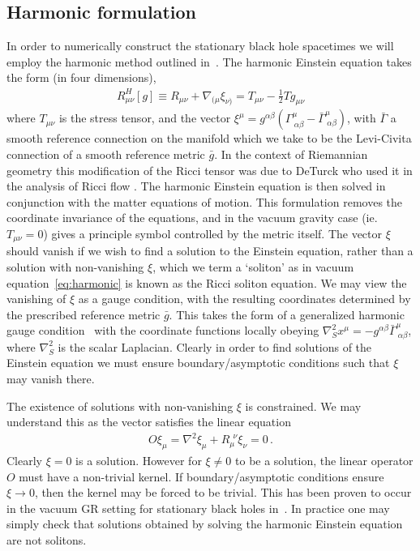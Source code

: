 \documentclass[12pt]{article}
\numberwithin{equation}{section}
\begin{document}
\subsection{Harmonic formulation}

In order to numerically construct the stationary black hole spacetimes we will employ the harmonic method outlined in~\cite{Headrick:2009pv,Adam:2011dn,Figueras:2012rb}.
The harmonic Einstein equation 
takes the form (in four dimensions),
\begin{eqnarray}
\label{eq:harmonic}
R^H_{\mu\nu}[g] \equiv R_{\mu\nu} + \nabla_{(\mu} \xi_{\nu)} = T_{\mu\nu} - \frac{1}{2} T g_{\mu\nu}
\end{eqnarray}
where $T_{\mu\nu}$ is the stress tensor, and the vector $\xi^\mu = g^{\alpha\beta} \left( \Gamma^\mu_{~\alpha\beta} - \bar{\Gamma}^\mu_{~\alpha\beta} \right)$, with $\bar{\Gamma}$ a smooth reference connection on the manifold which we take to be the Levi-Civita connection of a smooth reference metric $\bar{g}$. 
In the context of Riemannian geometry this modification of the Ricci tensor was due to DeTurck who used it in the analysis of Ricci flow \cite{DeTurck}.
The harmonic Einstein equation is then solved in conjunction with the matter equations of motion.
This formulation removes the coordinate invariance of the equations, and in the vacuum gravity case (ie. $T_{\mu\nu} = 0$) gives a principle symbol controlled by the metric itself. 
%
The vector $\xi$ should vanish if we wish to find a solution to the Einstein equation, rather than a solution with non-vanishing $\xi$, which we term a `soliton' as in vacuum  equation~\eqref{eq:harmonic}  is known as the Ricci soliton equation.
We may view the vanishing of $\xi$ as a gauge condition, with the resulting coordinates determined by the prescribed reference metric $\bar{g}$.
This takes the form of a generalized harmonic gauge condition~\cite{Friedrich,Garfinkle:2001ni} with the coordinate functions locally obeying $\nabla_S^2 x^\mu = - g^{\alpha\beta} \bar{\Gamma}^\mu_{~\alpha\beta}$, where $\nabla^2_S$ is the scalar Laplacian.
Clearly in order to find solutions of the Einstein equation we must ensure boundary/asymptotic conditions such that $\xi$ may vanish there.

The existence of solutions with non-vanishing $\xi$ is constrained. We may understand this as the vector satisfies the linear equation
\begin{eqnarray}
\label{eq:Oop}
O \xi_\mu =  \nabla^2 \xi_{\mu} + R_{\mu}^{~~\nu} \xi_{\nu}= 0 \, .
\end{eqnarray}
Clearly $\xi = 0$ is a solution. However for $\xi \ne 0$ to be a solution, the linear operator $O$ must have a non-trivial kernel. If  boundary/asymptotic conditions ensure $\xi \to 0$, then the kernel may be forced to be trivial. This has been proven to occur in the vacuum GR setting for stationary black holes in~\cite{Figueras:2011va,Figueras:2016nmo}. In practice one may simply check that solutions obtained by solving the harmonic Einstein equation are not solitons.
\end{document}
